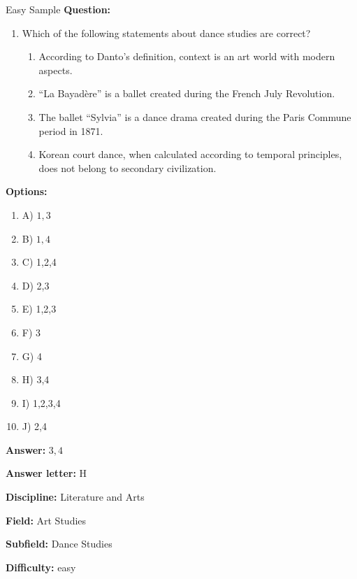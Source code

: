 \begin{easybox}{Easy Sample}
\textbf{Question:}
\begin{enumerate}[leftmargin=0.5cm, label={}]  
\item Which of the following statements about dance studies are correct?\begin{enumerate}[label=\arabic*.]
    \item According to Danto's definition, context is an art world with modern aspects.
    \item ``La Bayadère'' is a ballet created during the French July Revolution.
    \item The ballet ``Sylvia'' is a dance drama created during the Paris Commune period in 1871.
    \item Korean court dance, when calculated according to temporal principles, does not belong to secondary civilization.
\end{enumerate}
\end{enumerate}

\textbf{Options:}
\begin{enumerate}[leftmargin=0.5cm, label={}]  
\item A) $1,3$
\item B) $1,4$
\item C) 1,2,4
\item D) 2,3 
\item E) 1,2,3
\item F) 3 
\item G) 4
\item H) 3,4 
\item I) 1,2,3,4 
\item J) 2,4 
\end{enumerate}

\textbf{Answer:} $3,4$

\textbf{Answer letter:} H

\textbf{Discipline:} Literature and Arts

\textbf{Field:} Art Studies

\textbf{Subfield:} Dance Studies

\textbf{Difficulty:} easy
\end{easybox}

